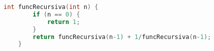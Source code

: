 \begin{lstlisting}[language=C++]
    int funcRecursiva(int n) {
        if (n == 0) {
            return 1;
        }
        return funcRecursiva(n-1) + 1/funcRecursiva(n-1);
    }
\end{lstlisting}